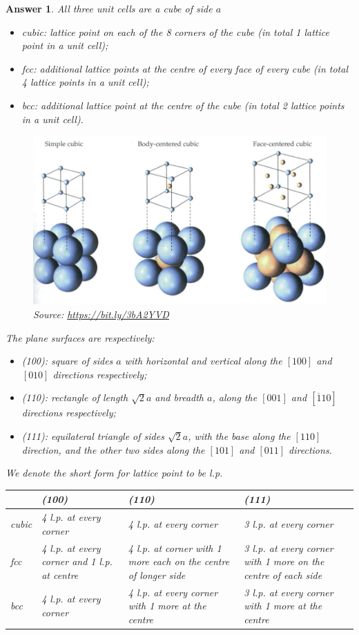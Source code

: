 \documentclass[a4paper]{article}
\newtheorem{ans}{Answer}[section]
\theoremstyle{new}
\begin{document}
\begin{ans}
All three unit cells are a cube of side $a$ 
\begin{itemize}
    \item cubic: lattice point on each of the 8 corners of the cube (in total 1 lattice point in a unit cell);
    \item fcc: additional lattice points at the centre of every face of every cube (in total 4 lattice points in a unit cell);
    \item bcc: additional lattice point at the centre of the cube (in total 2 lattice points in a unit cell).
\end{itemize}
\begin{figure}[H]
    \centering
    \includegraphics[scale=0.75]{4_1.PNG}
    \caption{Source: \url{https://bit.ly/3bA2YVD}}
\end{figure}
The plane surfaces are respectively:
\begin{itemize}
    \item (100): square of sides $a$ with horizontal and vertical along the $[100]$ and $[010]$ directions respectively;
    \item (110): rectangle of length $\sqrt{2}a$ and breadth $a$, along the $[001]$ and $[\overline{1}10]$ directions respectively;
    \item (111): equilateral triangle of sides $\sqrt{2}a$, with the base along the $[110]$ direction, and the other two sides along the $[101]$ and $[011]$ directions.
 \end{itemize}
We denote the short form for lattice point to be l.p. 
\begin{center}
  \begin{tabularx}{\textwidth}{l|X|X|X}
    &(100)&(110)&(111) \\
    \hline
    cubic & 4 l.p. at every corner& 4 l.p. at every corner & 3 l.p. at every corner\\
    fcc & 4 l.p. at every corner and 1 l.p. at centre & 4 l.p. at corner with 1 more each on the centre of longer side & 3 l.p. at every corner with 1 more on the centre of each side \\
    bcc & 4 l.p. at every corner & 4 l.p. at every corner with 1 more at the centre & 3 l.p. at every corner with 1 more at the centre
  \end{tabularx}
\end{center}

\end{ans}
\end{document}
